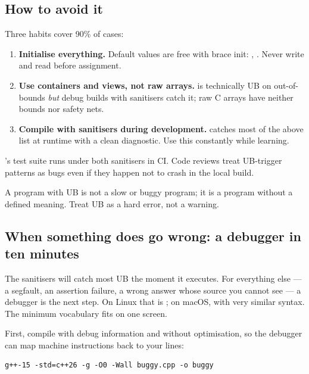 \subsection{How to avoid it}

Three habits cover 90\% of cases:

\begin{enumerate}[leftmargin=*]
  \item \textbf{Initialise everything.} Default values are free with
    brace init: , . Never write
     and read  before assignment.
  \item \textbf{Use containers and views, not raw arrays.}
     is technically UB on out-of-bounds
    \emph{but} debug builds with sanitisers catch it; raw C arrays
    have neither bounds nor safety nets.
  \item \textbf{Compile with sanitisers during development.}
     catches most of the above
    list at runtime with a clean diagnostic. Use this constantly
    while learning.
\end{enumerate}

\maya{}'s test suite runs under both sanitisers in CI. Code reviews
treat UB-trigger patterns as bugs even if they happen not to crash
in the local build.

\begin{warning}
A program with UB is not a slow or buggy program; it is a program
without a defined meaning. Treat UB as a hard error, not a warning.
\end{warning}

\subsection{When something does go wrong: a debugger in ten minutes}

The sanitisers will catch most UB the moment it executes. For
everything else --- a segfault, an assertion failure, a wrong answer
whose source you cannot see --- a debugger is the next step. On
Linux that is ; on macOS,  with very similar
syntax. The minimum vocabulary fits on one screen.

First, compile with debug information and without optimisation, so
the debugger can map machine instructions back to your lines:

\begin{lstlisting}[style=shell]
g++-15 -std=c++26 -g -O0 -Wall buggy.cpp -o buggy
\end{lstlisting}

